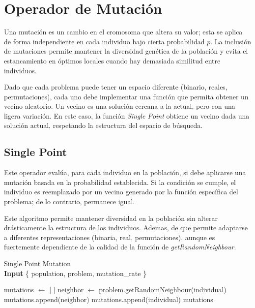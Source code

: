 \chapter{Operador de Mutación}

Una mutación es un cambio en el cromosoma que altera su valor; esta se aplica de forma independiente en cada individuo bajo cierta probabilidad $p$. La inclusión de mutaciones permite mantener la diversidad genética de la población y evita el estancamiento en óptimos locales cuando hay demasiada similitud entre individuos.

Dado que cada problema puede tener un espacio diferente (binario, reales, permutaciones), cada uno debe implementar una función que permita obtener un vecino aleatorio. Un vecino es una solución cercana a la actual, pero con una ligera variación. En este caso, la función \textit{Single Point} obtiene un vecino dada una solución actual, respetando la estructura del espacio de búsqueda.

\section{Single Point}

Este operador evalúa, para cada individuo en la población, si debe aplicarse una mutación basada en la probabilidad establecida. Si la condición se cumple, el individuo es reemplazado por un vecino generado por la función específica del problema; de lo contrario, permanece igual.

Este algoritmo permite mantener diversidad en la población sin alterar drásticamente la estructura de los individuos. Ademas, de que permite adaptarse a diferentes representaciones (binaria, real, permutaciones), aunque es fuertemente dependiente de la calidad de la función de \textit{getRandomNeighbour}.

\begin{algorithm}[H]
	\caption{Single Point Mutation \\ \textbf{Input} \{ population, problem, mutation\_rate \}}
	\begin{algorithmic}[1]
		\State mutations $\gets$ [ ]
		\State neighbor $\gets$ problem.getRandomNeighbour(individual)
		\State mutations.append(neighbor)
		\Else
		\State mutations.append(individual)
		\EndIf
		\EndFor
		\State \Return mutations
		\EndFunction
	\end{algorithmic}
	\label{alg:mutation_single}
\end{algorithm}

